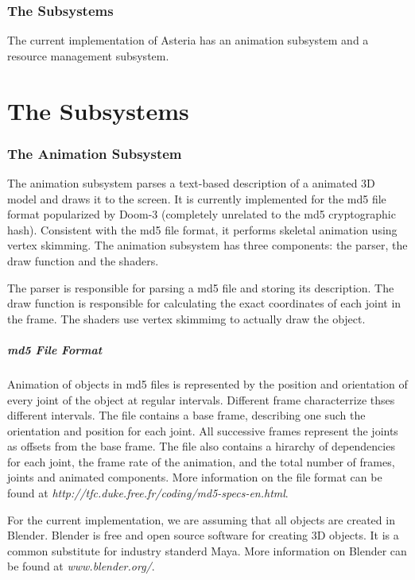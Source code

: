 \documentclass[10pt]{article}
\begin{document}
\section{The Subsystems}

The current implementation of Asteria has an animation subsystem and a resource
management subsystem.  


\part*{The Subsystems}
\section{The Animation Subsystem}
The animation subsystem parses a text-based description of a animated 3D model
and draws it to the screen. It is currently implemented for the md5 file format
popularized by Doom-3 (completely unrelated to the md5 cryptographic hash).
Consistent with the md5 file format, it performs skeletal animation using vertex 
skimming. The animation subsystem has three components: the parser, the draw 
function and the shaders.

The parser is responsible for parsing a md5 file and storing its description.
The draw function is responsible for calculating the exact coordinates of each
joint in the frame. The shaders use vertex skimmimg to actually draw the object. 

\subsubsection*{md5 File Format}
Animation of objects in md5 files is represented by the position and orientation
of every joint of the object at regular intervals. Different frame characterrize
thses different intervals. The file contains a base frame, 
describing one such the orientation and position for each joint. All successive 
frames represent the joints as offsets from the base frame. The file also contains 
a hirarchy of dependencies for each joint, the frame rate of the animation, and 
the total number of frames, joints and animated components. More information on
the file format can be found at
\textit{http://tfc.duke.free.fr/coding/md5-specs-en.html}.

For the current implementation, we are assuming that all objects are created in
Blender. Blender is free and open source software for creating 3D objects. It is
a common substitute for industry standerd Maya. More information on Blender can
be found at \textit{www.blender.org/}.
\end{document}
